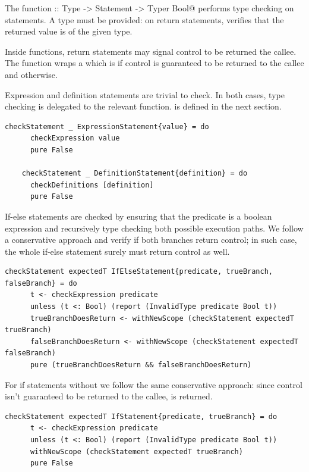 \documentclass[UdineBachThesis,american,11pt]{PhdThesis}
\begin{document}
  The function \lstinline@checkStatement :: Type -> Statement -> Typer Bool@
  performs type \linebreak checking on statements. A type must be provided: on
  return statements, \lstinline@checkStatement@  verifies that the returned
  value is of the given type.

  Inside functions, return statements may signal control to be returned the
  callee. The function \lstinline@checkStatement@ wraps a \lstinline@Bool@ which
  is \lstinline@True@ if control is guaranteed to be returned to the callee and
  \lstinline@False@ otherwise.

  Expression and definition statements are trivial to check. In both cases, type
  checking is delegated to the relevant function. \lstinline@checkDefinitions@
  is defined in the next section.

  \begin{lstlisting}[gobble=4,basicstyle=\ttfamily\small]
    checkStatement _ ExpressionStatement{value} = do
      checkExpression value
      pure False

    checkStatement _ DefinitionStatement{definition} = do
      checkDefinitions [definition]
      pure False
  \end{lstlisting}

  If-else statements are checked by ensuring that the predicate is a boolean
  expression and recursively type checking both possible execution paths. We
  follow a conservative approach and verify if both branches return control; in
  such case, the whole if-else statement surely must return control as well.

  \begin{lstlisting}[gobble=4,basicstyle=\ttfamily\small]
    checkStatement expectedT IfElseStatement{predicate, trueBranch, falseBranch} = do
      t <- checkExpression predicate
      unless (t <: Bool) (report (InvalidType predicate Bool t))
      trueBranchDoesReturn <- withNewScope (checkStatement expectedT trueBranch)
      falseBranchDoesReturn <- withNewScope (checkStatement expectedT falseBranch)
      pure (trueBranchDoesReturn && falseBranchDoesReturn)
  \end{lstlisting}

  For if statements without \lstinline@else@ we follow the same conservative
  approach: since control isn't guaranteed to be returned to the callee,
  \lstinline@False@ is returned.

  \begin{lstlisting}[gobble=4,basicstyle=\ttfamily\small]
    checkStatement expectedT IfStatement{predicate, trueBranch} = do
      t <- checkExpression predicate
      unless (t <: Bool) (report (InvalidType predicate Bool t))
      withNewScope (checkStatement expectedT trueBranch)
      pure False
  \end{lstlisting}
\end{document}
